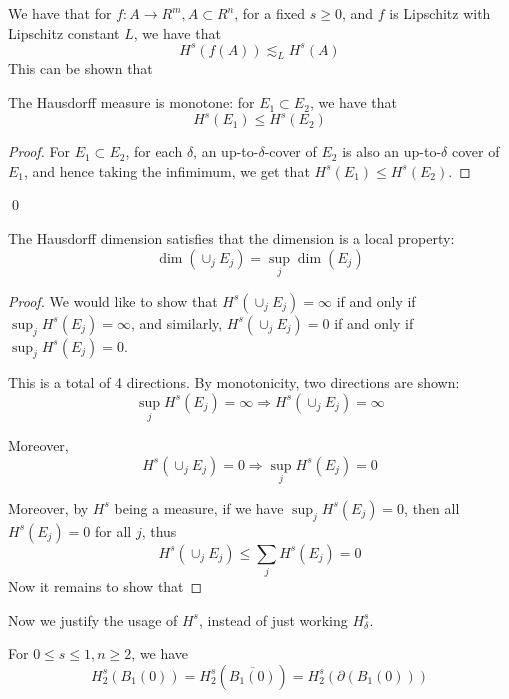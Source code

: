 \begin{exercise}
    We have that for $f: A\to R^m, A\subset R^n$, for a fixed $s\geq 0$, and $f$ is Lipschitz with Lipschitz constant $L$, we have that 
    \begin{equation*}
        H^s(f(A))\lesssim_LH^s(A)
    \end{equation*}
    This can be shown that  
\end{exercise}

\begin{proposition}
    The Hausdorff measure is monotone: for $E_1\subset E_2$, we have that
    \begin{equation*}
        H^s(E_1)\leq H^s(E_2)
    \end{equation*}
\end{proposition}
\begin{proof}
    For $E_1\subset E_2$, for each $\delta$,  an up-to-$\delta$-cover of $E_2$ is also an up-to-$\delta$ cover of $E_1$, and hence taking the infimimum, we get that $H^s(E_1)\leq H^s(E_2)$.
\end{proof}
\qed


\begin{proposition}
    The Hausdorff dimension satisfies that the dimension is a local property:
    \begin{equation*}
        \dim(\cup_jE_j)=\sup_j\dim(E_j)
    \end{equation*}
\end{proposition}
\begin{proof}
    We would like to show that $H^s(\cup_jE_j)=\infty$ if and only if $\sup_jH^s(E_j)=\infty$, and similarly, $H^s(\cup_jE_j)=0$ if and only if $\sup_jH^s(E_j)=0$.

    This is a total of 4 directions. By monotonicity, two directions are shown:
    \begin{equation*}
        \sup_jH^s(E_j)=\infty \Rightarrow H^s(\cup_jE_j)=\infty
    \end{equation*}

    Moreover,
    \begin{equation*}
        H^s(\cup_jE_j)=0\Rightarrow \sup_jH^s(E_j)=0
    \end{equation*}

    Moreover, by $H^s$ being a measure, if we have $\sup_jH^s(E_j)=0$, then all $H^s(E_j)=0$ for all $j$, thus
    \begin{equation*}
        H^s(\cup_jE_j)\leq\sum_jH^s(E_j)=0
    \end{equation*}
    Now it remains to show that 

\end{proof}


Now we justify the usage of $H^s$, instead of just working $H_\delta^s$.
\begin{exercise}
    For $0\leq s\leq 1, n\geq 2$, we have
    \begin{equation*}
        H_2^s(B_1(0))=H_2^s(\overline{B_1(0)})=H_2^s(\partial(B_1(0)))
    \end{equation*}
\end{exercise}